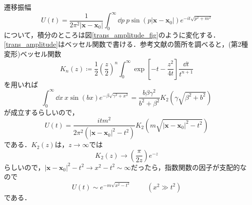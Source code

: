 \documentclass[a4paper,pdflatex,ja=standard]{bxjsarticle}
\begin{document}
遷移振幅
\begin{equation}
  U(t)
  =
  \frac{1}{2\pi^2|\bm{x}-\bm{x}_{0}|}
  \int_{0}^{\infty} \dd p\ 
  p\sin(p|\bm{x}-\bm{x}_{0}|)e^{-it\sqrt{p^2+m^2}}
  \label{trans_amplitude}
\end{equation}
について，積分のところは図\ref{trans_amplitude_fig}のように変化する．\eqref{trans_amplitude}はベッセル関数で書ける．参考文献の箇所を調べると，(第2種変形)ベッセル関数
\begin{equation}
  K_{n}(z)
  \coloneqq
  \frac{1}{2}\left( \frac{z}{2} \right)^{n}
  \int_{0}^{\infty}\exp\left[ -t-\frac{z^2}{4t} \right]\frac{\dd t}{t^{n+1}}
\end{equation}
を用いれば
\begin{equation}
  \int_{0}^{\infty}\dd x\ x\sin(bx)e^{-\beta\sqrt{\gamma^2+x^2}}
  =
  \frac{b\beta\gamma^2}{b^2+\beta^2}K_{2}(\gamma\sqrt{\beta^2+b^2})
\end{equation}
が成立するらしいので，
\begin{equation}
  U(t)
  =
  \frac{itm^2}{2\pi^2(|\bm{x}-\bm{x}_{0}|^2-t^2)}K_{2}(m\sqrt{|\bm{x}-\bm{x}_{0}|^2-t^2})
\end{equation}
である．$K_{2}(z)$は，$z\rightarrow\infty$では
\begin{equation}
  K_{2}(z)
  \rightarrow
  \left( \frac{\pi}{2z} \right)e^{-z}
\end{equation}
らしいので，$|\bm{x}-\bm{x}_{0}|^2-t^2\rightarrow x^2-t^2\sim\infty$だったら，指数関数の因子が支配的なので
\begin{equation}
  U(t)
  \sim
  e^{-m\sqrt{x^2-t^2}}
  \hspace{1cm}
  (x^2\gg t^2)
\end{equation}
である．
\\
\end{document}
